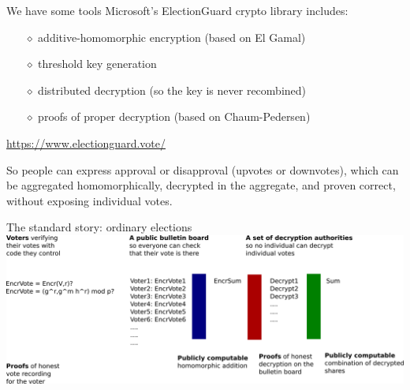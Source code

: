 \documentclass[10pt,xcolor=svgnames,169]{beamer} %
\begin{document}
	\begin{frame}[fragile]{We have some tools} %
		Microsoft's ElectionGuard crypto library includes: %
		\begin{itemize} %
			\item[$\diamond$] additive-homomorphic encryption (based on El Gamal)
			\item[$\diamond$] threshold key generation
			\item[$\diamond$] distributed decryption (so the key is never recombined)
			\item[$\diamond$] proofs of proper decryption (based on Chaum-Pedersen)
		\end{itemize}
	
		\url{https://www.electionguard.vote/}

	So people can express approval or disapproval (upvotes or downvotes), which can be aggregated homomorphically, decrypted in the aggregate, and proven correct, without exposing individual votes.
		
	\end{frame}
	
		\begin{frame}[fragile]{The standard story: ordinary elections}
	\includegraphics[scale=0.17]{e2e-vVoting-homomorphicAddition.png}
\end{frame}

%	
\end{document}
